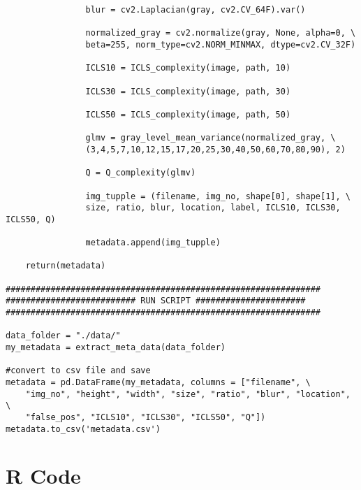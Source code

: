 \documentclass[12pt]{article}
\begin{document}
\begin{verbatim}
                blur = cv2.Laplacian(gray, cv2.CV_64F).var()

				normalized_gray = cv2.normalize(gray, None, alpha=0, \
				beta=255, norm_type=cv2.NORM_MINMAX, dtype=cv2.CV_32F)

                ICLS10 = ICLS_complexity(image, path, 10)

                ICLS30 = ICLS_complexity(image, path, 30)

                ICLS50 = ICLS_complexity(image, path, 50)

				glmv = gray_level_mean_variance(normalized_gray, \
				(3,4,5,7,10,12,15,17,20,25,30,40,50,60,70,80,90), 2)

                Q = Q_complexity(glmv)

				img_tupple = (filename, img_no, shape[0], shape[1], \
				size, ratio, blur, location, label, ICLS10, ICLS30, ICLS50, Q)

                metadata.append(img_tupple)
    
    return(metadata)

###############################################################
########################## RUN SCRIPT ######################
###############################################################

data_folder = "./data/"
my_metadata = extract_meta_data(data_folder)

#convert to csv file and save
metadata = pd.DataFrame(my_metadata, columns = ["filename", \
	"img_no", "height", "width", "size", "ratio", "blur", "location", \
	"false_pos", "ICLS10", "ICLS30", "ICLS50", "Q"])
metadata.to_csv('metadata.csv')
\end{verbatim}


\section{R Code}\label{ARcode}
\end{document}
